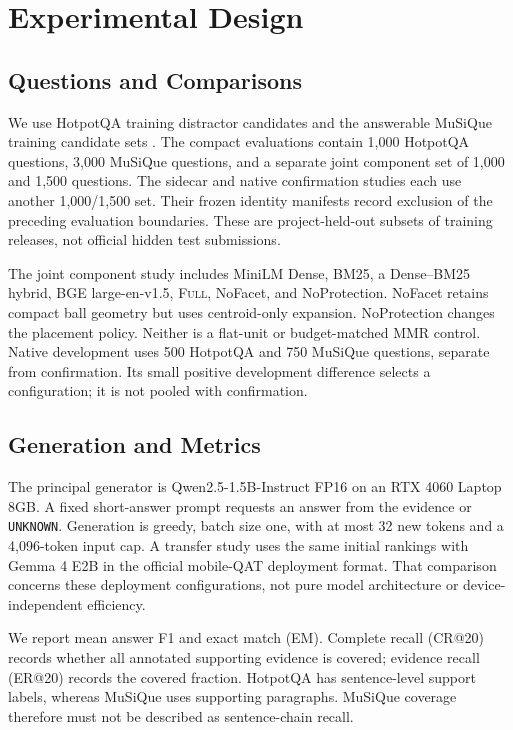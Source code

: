 \documentclass[11pt]{article}
\newcommand{\full}{\textsc{Full}\xspace}
\begin{document}
\section{Experimental Design}
\subsection{Questions and Comparisons}
We use HotpotQA training distractor candidates and the answerable MuSiQue
training candidate sets \citep{yang2018hotpotqa,trivedi2022musique}.
The compact evaluations contain 1,000 HotpotQA questions, 3,000 MuSiQue
questions, and a separate joint component set of 1,000 and 1,500 questions.
The sidecar and native confirmation studies each use another 1,000/1,500
set. Their frozen identity manifests record exclusion of the preceding
evaluation boundaries. These are project-held-out subsets of training
releases, not official hidden test submissions.

The joint component study includes MiniLM Dense, BM25, a Dense--BM25 hybrid,
BGE large-en-v1.5, \full, NoFacet, and NoProtection.
NoFacet retains compact ball geometry but uses centroid-only expansion.
NoProtection changes the placement policy. Neither is a flat-unit or
budget-matched MMR control.
Native development uses 500 HotpotQA and 750 MuSiQue questions, separate from
confirmation. Its small positive development difference selects a
configuration; it is not pooled with confirmation.

\subsection{Generation and Metrics}
The principal generator is Qwen2.5-1.5B-Instruct FP16 on an RTX 4060 Laptop
8GB. A fixed short-answer prompt requests an answer from the evidence or
\texttt{UNKNOWN}. Generation is greedy, batch size one, with at most 32 new
tokens and a 4,096-token input cap. A transfer study uses the same initial
rankings with Gemma 4 E2B in the official mobile-QAT deployment format.
That comparison concerns these deployment configurations, not pure model
architecture or device-independent efficiency.

We report mean answer F1 and exact match (EM). Complete recall (CR@20)
records whether all annotated supporting evidence is covered; evidence recall
(ER@20) records the covered fraction. HotpotQA has sentence-level support
labels, whereas MuSiQue uses supporting paragraphs. MuSiQue coverage therefore
must not be described as sentence-chain recall.
\end{document}

